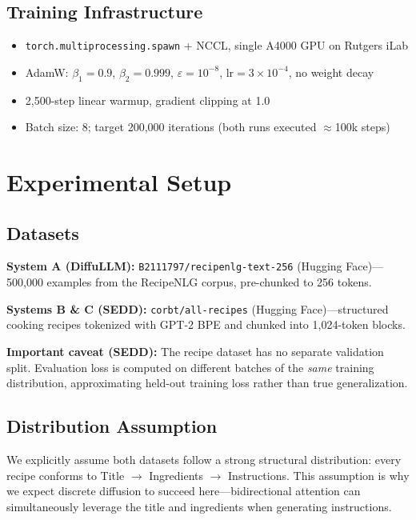 \documentclass[11pt,a4paper]{article}
\begin{document}
\subsection{Training Infrastructure}

\begin{itemize}[nosep]
  \item \texttt{torch.multiprocessing.spawn} + NCCL, single A4000 GPU on Rutgers iLab
  \item AdamW: $\beta_1 = 0.9$, $\beta_2 = 0.999$, $\varepsilon = 10^{-8}$, $\mathrm{lr} = 3\times10^{-4}$, no weight decay
  \item 2,500-step linear warmup, gradient clipping at 1.0
  \item Batch size: 8; target 200,000 iterations (both runs executed $\approx$100k steps)
\end{itemize}

\section{Experimental Setup}

\subsection{Datasets}

\textbf{System A (DiffuLLM):} \texttt{B2111797/recipenlg-text-256} (Hugging Face)---500,000 examples from the RecipeNLG corpus, pre-chunked to 256 tokens.

\textbf{Systems B \& C (SEDD):} \texttt{corbt/all-recipes} (Hugging Face)---structured cooking recipes tokenized with GPT-2 BPE and chunked into 1,024-token blocks.

\textbf{Important caveat (SEDD):} The recipe dataset has no separate validation split. Evaluation loss is computed on different batches of the \emph{same} training distribution, approximating held-out training loss rather than true generalization.

\subsection{Distribution Assumption}

We explicitly assume both datasets follow a strong structural distribution: every recipe conforms to Title $\to$ Ingredients $\to$ Instructions. This assumption is why we expect discrete diffusion to succeed here---bidirectional attention can simultaneously leverage the title and ingredients when generating instructions.
\end{document}
